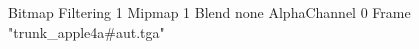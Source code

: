 {Bitmap
	{Filtering 1}
	{Mipmap 1}
	{Blend none}
	{AlphaChannel 0}
	{Frame "trunk_apple4a#aut.tga"}
}
